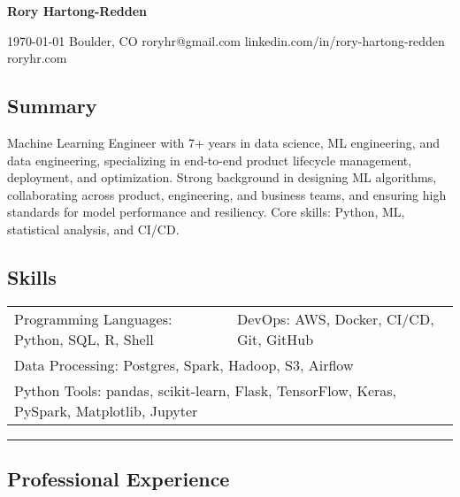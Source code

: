 \documentclass[10pt,letterpaper]{article}
\newenvironment{indentsection}[1]
{\begin{list}{}%
	{\setlength{\leftmargin}{#1}}
	\item[]%
}
{\end{list}}
\begin{document}
{\raggedright \LARGE \bf Rory Hartong-Redden}

{\raggedleft 
\today \/ \textbar
\/ Boulder, CO \textbar
\/ roryhr@gmail.com \textbar
\/ linkedin.com/in/rory-hartong-redden \textbar
\/ roryhr.com
\\
}


\subsection*{Summary}
\begin{centering}
Machine Learning Engineer with 7+ years in data science, ML engineering, and data engineering, specializing in end-to-end product lifecycle management, deployment, and optimization. 
Strong background in designing ML algorithms, collaborating across product, engineering, and business teams, and ensuring high standards for model performance and resiliency. 
Core skills: Python, ML, statistical analysis, and CI/CD.
\end{centering}

\subsection*{Skills}
\begin{indentsection}{\parindent}
\begin{tabular}{p{0.5\linewidth}   p{0.5\linewidth}} 
    Programming Languages: Python, SQL, R, Shell
    & DevOps: AWS, Docker, CI/CD, Git, GitHub \\
    \multicolumn{2}{l}{Data Processing: Postgres, Spark, Hadoop, S3, Airflow} \\
    \multicolumn{2}{l}{
        Python Tools: pandas, scikit-learn, Flask, TensorFlow, Keras, PySpark, Matplotlib, Jupyter
        } \\
\end{tabular}
\end{indentsection}

\hrule
\subsection*{Professional Experience}
\end{document}
